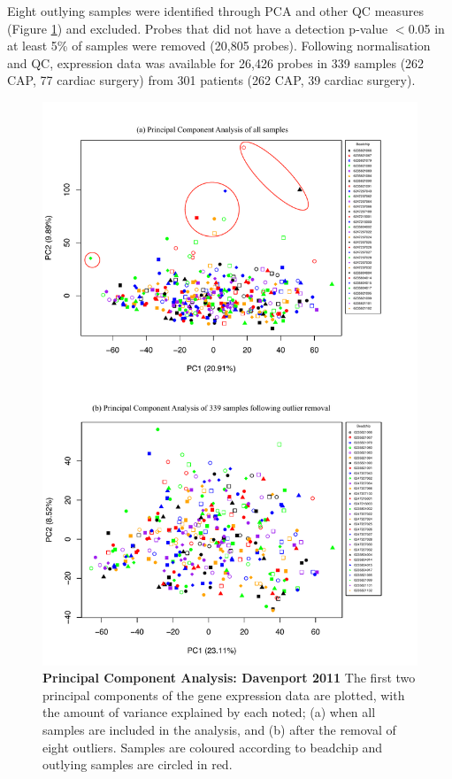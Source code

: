 Eight outlying samples were identified through PCA and other QC measures (Figure \ref{fig:PCAEmma}) and excluded. Probes that did not have a detection p-value $<$0.05 in at least 5\% of samples were removed (20,805 probes). Following normalisation and QC, expression data was available for 26,426 probes in 339 samples (262 CAP, 77 cardiac surgery) from 301 patients (262 CAP, 39 cardiac surgery).

\FloatBarrier
\begin{figure}[htbp]
\centering
\includegraphics[scale=0.7]{./Results3/Images/PCA_Davenport2011.pdf}
\caption[Principal Component Analysis: Davenport 2011]{\textbf{Principal Component Analysis: Davenport 2011} The first two principal components of the gene expression data are plotted, with the amount of variance explained by each noted; (a) when all samples are included in the analysis, and (b) after the removal of eight outliers. Samples are coloured according to beadchip and outlying samples are circled in red.}
\label{fig:PCAEmma}
\end{figure}

